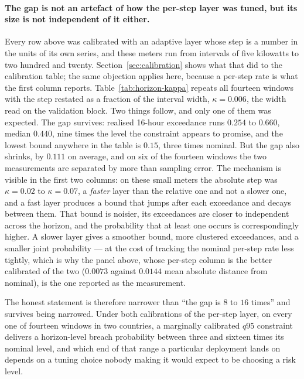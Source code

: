 

\paragraph{The gap is not an artefact of how the per-step layer was tuned, but
its size is not independent of it either.} Every row above was calibrated with
an adaptive layer whose step is a number in the units of its own series, and
these meters run from intervals of five kilowatts to two hundred and twenty.
Section~\ref{sec:calibration} shows what that did to the calibration table;
the same objection applies here, because a per-step rate is what the first
column reports. Table~\ref{tab:horizon-kappa} repeats all fourteen windows
with the step restated as a fraction of the interval width, $\kappa=0.006$,
the width read on the validation block. Two things follow, and only one of them
was expected. The gap survives: realised 16-hour exceedance runs $0.254$ to
$0.660$, median $0.440$, nine times the level the constraint appears to
promise, and the lowest bound anywhere in the table is $0.15$, three times
nominal. But the gap also shrinks, by $0.111$ on average, and on six of the
fourteen windows the two measurements are separated by more than sampling
error. The mechanism is visible in the first two columns: on these small meters
the absolute step was $\kappa=0.02$ to $\kappa=0.07$, a \emph{faster} layer
than the relative one and not a slower one, and a fast layer produces a bound
that jumps after each exceedance and decays between them. That bound is
noisier, its exceedances are closer to independent across the horizon, and the
probability that at least one occurs is correspondingly higher. A slower layer
gives a smoother bound, more clustered exceedances, and a smaller joint
probability --- at the cost of tracking the nominal per-step rate less
tightly, which is why the panel above, whose per-step column is the better
calibrated of the two ($0.0073$ against $0.0144$ mean absolute distance from
nominal), is the one reported as the measurement.

The honest statement is therefore narrower than ``the gap is $8$ to $16$
times'' and survives being narrowed. Under both calibrations of the per-step
layer, on every one of fourteen windows in two countries, a marginally
calibrated $q95$ constraint delivers a horizon-level breach probability
between three and sixteen times its nominal level, and which end of that range
a particular deployment lands on depends on a tuning choice nobody making it
would expect to be choosing a risk level.
